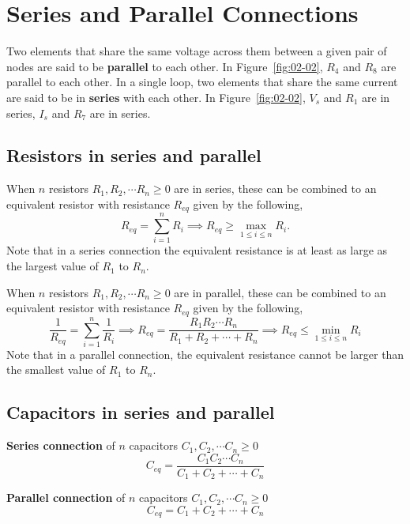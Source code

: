 \section{Series and Parallel Connections}
Two elements that share the same voltage across them between a given pair of nodes are said to be \textbf{parallel} to each other. In Figure~\ref{fig:02-02}, $R_4$ and $R_8$ are parallel to each other. In a single loop, two elements that share the same current are said to be in \textbf{series} with each other. In Figure~\ref{fig:02-02}, $V_s$ and $R_1$ are in series, $I_s$ and $R_7$ are in series.

\subsection{Resistors in series and parallel}
When $n$ resistors $R_1, R_2, \cdots R_n \geq 0$ are in series, these can be combined to an equivalent resistor with resistance $R_{eq}$ given by the following,
\begin{equation}
    R_{eq} = \sum_{i=1}^{n} R_i \implies R_{eq} \geq \max_{1 \leq i \leq n} R_i.
    \label{eq:02-13}
\end{equation}
Note that in a series connection the equivalent resistance is at least as large as the largest value of $R_1$ to $R_n$.

When $n$ resistors $R_1, R_2, \cdots R_n \geq 0$ are in parallel, these can be combined to an equivalent resistor with resistance $R_{eq}$ given by the following,
\begin{equation}
    \frac{1}{R_{eq}} = \sum_{i=1}^{n} \frac{1}{R_i} \implies R_{eq} = \frac{R_1R_2\cdots R_n}{R_1 + R_2 + \cdots + R_n} \implies R_{eq} \leq \min_{1 \leq i \leq n} R_i
    \label{eq:02-14}
\end{equation}
Note that in a parallel connection, the equivalent resistance cannot be larger than the smallest value of $R_1$ to $R_n$.

\subsection{Capacitors in series and parallel}
\noindent\textbf{Series connection} of $n$ capacitors $C_1, C_2, \cdots C_n \geq 0$
\begin{equation}
    C_{eq} = \frac{C_1C_2\cdots C_n}{C_1 + C_2 + \cdots + C_n}
    \label{eq:02-15}
\end{equation}

\noindent\textbf{Parallel connection} of $n$ capacitors $C_1, C_2, \cdots C_n \geq 0$
\begin{equation}
    C_{eq} = C_1 + C_2 + \cdots + C_n
    \label{eq:02-16}
\end{equation}

